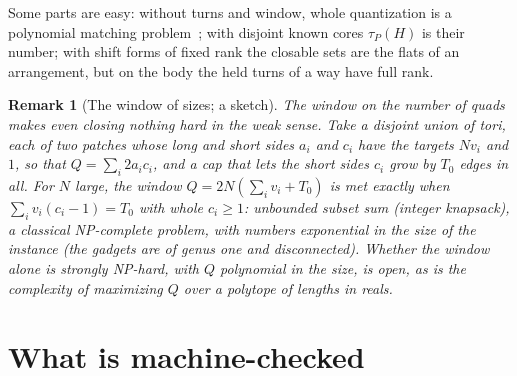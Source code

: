 \documentclass[11pt,a4paper]{article}
\newtheorem{remark}{Remark}
\newenvironment{evidence}[3][]{}{}
\begin{document}
Some parts are easy: without turns and window, whole quantization is a
polynomial matching problem~\cite{edmonds1970matching}; with disjoint known
cores $\tau_P(H)$ is their number; with shift forms of fixed rank the closable
sets are the flats of an arrangement, but on the body the held turns of a way
have full rank. %

\begin{evidence}{open}{a sketch}
\begin{remark}[The window of sizes; a sketch]
The window on the number of quads makes even closing nothing hard in the weak
sense. Take a disjoint union of tori, each of two patches whose long and short
sides $a_i$ and $c_i$ have the targets $N v_i$ and $1$, so that $Q = \sum_i 2
a_i c_i$, and a cap that lets the
short sides $c_i$ grow by $T_0$ edges in all. For $N$ large, the window $Q =
2N(\sum_i v_i + T_0)$ is met exactly when $\sum_i v_i(c_i - 1) = T_0$ with
whole $c_i \ge 1$: unbounded subset sum (integer knapsack), a classical
NP-complete problem, with numbers exponential in the size of the
instance (the gadgets are of genus one and disconnected). Whether the window
alone is strongly NP-hard, with $Q$ polynomial in the size, is open, as is the
complexity of maximizing $Q$ over a polytope of lengths in reals.
\end{remark}
\end{evidence}

\section{What is machine-checked}\label{sec:lean}
\end{document}
